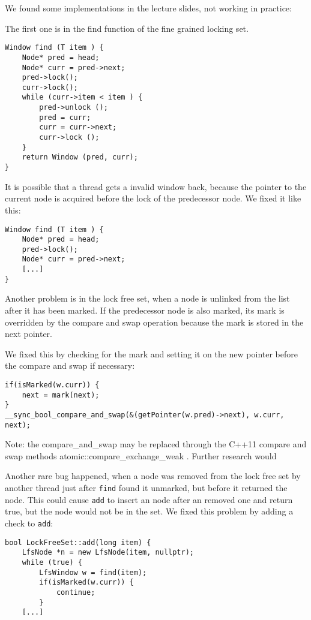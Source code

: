 We found some implementations in the lecture slides, not working in practice:

The first one is in the find function of the fine grained locking set.
\begin{lstlisting}
Window find (T item ) {
	Node* pred = head;
	Node* curr = pred->next;
	pred->lock();
	curr->lock();
	while (curr->item < item ) {
		pred->unlock ();
		pred = curr;
		curr = curr->next;
		curr->lock ();
	}
	return Window (pred, curr);
}
\end{lstlisting}
It is possible that a thread gets a invalid window back, because the pointer to the current node is acquired before the lock of the predecessor node. We fixed it like this:

\begin{lstlisting}
Window find (T item ) {
	Node* pred = head;
	pred->lock();
	Node* curr = pred->next;
	[...]
}
\end{lstlisting}

Another problem is in the lock free set, when a node is unlinked from the list after it has been marked. If the predecessor node is also marked, its mark is overridden by the compare and swap operation because the mark is stored in the next pointer. 

We fixed this by checking for the mark and setting it on the new pointer before the compare and swap if necessary:

\begin{lstlisting}
if(isMarked(w.curr)) {
	next = mark(next);
}		
__sync_bool_compare_and_swap(&(getPointer(w.pred)->next), w.curr, next);
\end{lstlisting}
Note: the compare\_and\_swap may be replaced through the C++11 compare and swap methods atomic::compare\_exchange\_weak \cite{cppref:compare_exchange}. Further research would


Another rare bug happened, when a node was removed from the lock free set by another thread just after \texttt{find} found it unmarked, but before it returned the node. This could cause \texttt{add} to insert an node after an removed one and return true, but the node would not be in the set. We fixed this problem by adding a check to \texttt{add}:

\begin{lstlisting}
bool LockFreeSet::add(long item) {
	LfsNode *n = new LfsNode(item, nullptr);
	while (true) {
		LfsWindow w = find(item);	
		if(isMarked(w.curr)) {
			continue;
		}
    [...]
\end{lstlisting}


